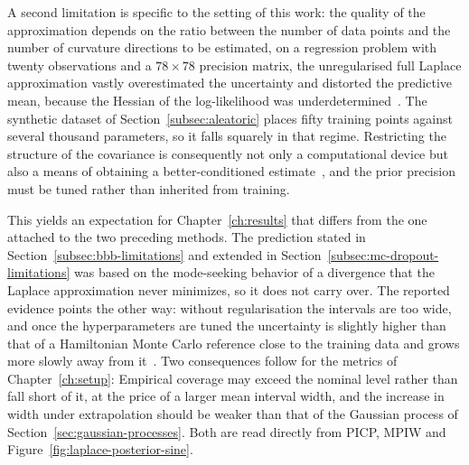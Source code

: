 A second limitation is specific to the setting of this work: the quality of the
approximation depends on the ratio between the number of data points and the
number of curvature directions to be estimated, on a regression problem with
twenty observations and a $78 \times 78$ precision matrix, the unregularised full
Laplace approximation vastly overestimated the uncertainty and distorted the
predictive mean, because the Hessian of the log-likelihood was
underdetermined~\cite{ritter2018}. The synthetic dataset of
Section~\ref{subsec:aleatoric} places fifty training points against several
thousand parameters, so it falls squarely in that regime. Restricting the
structure of the covariance is consequently not only a computational device but
also a means of obtaining a better-conditioned estimate~\cite{ritter2018}, and
the prior precision must be tuned rather than inherited from training.

This yields an expectation for Chapter~\ref{ch:results} that differs from the one
attached to the two preceding methods. The prediction stated in
Section~\ref{subsec:bbb-limitations} and extended in
Section~\ref{subsec:mc-dropout-limitations} was based on the mode-seeking behavior
of a divergence that the Laplace approximation never minimizes, so it does not
carry over. The reported evidence points the other way: without regularisation
the intervals are too wide, and once the hyperparameters are tuned the
uncertainty is slightly higher than that of a Hamiltonian Monte Carlo reference
close to the training data and grows more slowly away from
it~\cite{ritter2018}. Two consequences follow for the metrics of
Chapter~\ref{ch:setup}: Empirical coverage may exceed the nominal level rather
than fall short of it, at the price of a larger mean interval width, and the
increase in width under extrapolation should be weaker than that of the Gaussian
process of Section~\ref{sec:gaussian-processes}. Both are read directly from
PICP, MPIW and Figure~\ref{fig:laplace-posterior-sine}.


